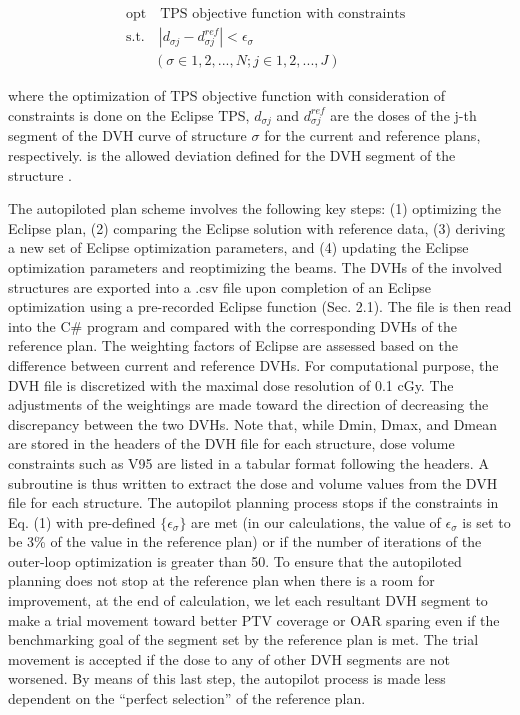 \begin{align}\label{eq:eq3.1}
& \text{opt} \quad \text{TPS objective function with constraints} \nonumber\\
& \text{s.t.} \quad |d_{\sigma j} - d^{ref}_{\sigma j}| < \epsilon_{\sigma} \\
& \quad \quad (\sigma \in 1,2,...,N; j \in 1,2,...,J) \nonumber
\end{align}

where the optimization of TPS objective function with consideration of constraints is done on the Eclipse TPS, $d_{\sigma j}$ and $d^{ref}_{\sigma j}$ are the doses of the j-th segment of the DVH curve of structure $\sigma$ for the current and reference plans, respectively.  is the allowed deviation defined for the DVH segment of the structure  .

The autopiloted plan scheme involves the following key steps: (1) optimizing the Eclipse plan, (2) comparing the Eclipse solution with reference data, (3) deriving a new set of Eclipse optimization parameters, and (4) updating the Eclipse optimization parameters and reoptimizing the beams. The DVHs of the involved structures are exported into a .csv file upon completion of an Eclipse optimization using a pre-recorded Eclipse function (Sec. 2.1). The file is then read into the C\# program and compared with the corresponding DVHs of the reference plan. The weighting factors of Eclipse are assessed based on the difference between current and reference DVHs. For computational purpose, the DVH file is discretized with the maximal dose resolution of 0.1 cGy. The adjustments of the weightings are made toward the direction of decreasing the discrepancy between the two DVHs. Note that, while Dmin, Dmax, and Dmean are stored in the headers of the DVH file for each structure, dose volume constraints such as V95 are listed in a tabular format following the headers. A subroutine is thus written to extract the dose and volume values from the DVH file for each structure. The autopilot planning process stops if the constraints in Eq. (1) with pre-defined $\{\epsilon_{\sigma}\}$ are met (in our calculations, the value of $\epsilon_{\sigma}$ is set to be 3\% of the value in the reference plan) or if the number of iterations of the outer-loop optimization is greater than 50. To ensure that the autopiloted planning does not stop at the reference plan when there is a room for improvement, at the end of calculation, we let each resultant DVH segment to make a trial movement toward better PTV coverage or OAR sparing even if the benchmarking goal of the segment set by the reference plan is met. The trial movement is accepted if the dose to any of other DVH segments are not worsened.  By means of this last step, the autopilot process is made less dependent on the ``perfect selection'' of the reference plan.

